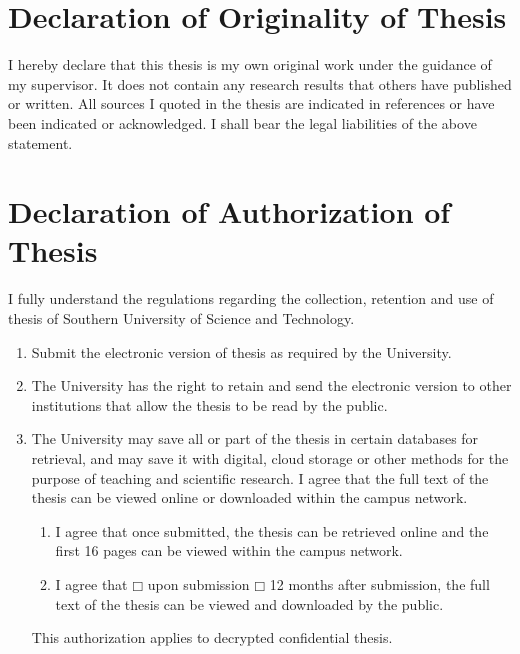 \begin{statementcopyright}
  \section*{Declaration of Originality of Thesis}
  \vspace{1em}

    I hereby declare that this thesis is my own original work under the guidance of my supervisor. It does not contain any research results that others have published or written. All sources I quoted in the thesis are indicated in references or have been indicated or acknowledged. I shall bear the legal liabilities of the above statement.

  \authorsign

  \section*{Declaration of Authorization of Thesis}

  \vspace{1em}

    I fully understand the regulations regarding the collection, retention and use of thesis of Southern University of Science and Technology.
    \begin{enumerate}
      \item Submit the electronic version of thesis as required by the University.
      \item The University has the right to retain and send the electronic version to other institutions that allow the thesis to be read by the public.
      \item The University may save all or part of the thesis in certain databases for retrieval, and may save it with digital, cloud storage or other methods for the purpose of teaching and scientific research. I agree that the full text of the thesis can be viewed online or downloaded within the campus network.
      \begin{enumerate}[label={\arabic*)}]
        \item I agree that once submitted, the thesis can be retrieved online and the first 16 pages can be viewed within the campus network.
        \item I agree that $\mdlgwhtsquare$ upon submission $\mdlgwhtsquare$ 12 months after submission, the full text of the thesis can be viewed and downloaded by the public.
      \end{enumerate}
      This authorization applies to decrypted confidential thesis.
    \end{enumerate}


  \authorsupervisorsign

\end{statementcopyright}